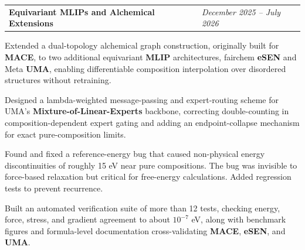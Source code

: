\documentclass[11pt,a4paper]{article}
\makeatletter
\newcommand{\subrole}[2]{%
  \vspace{0.45em}%
  \noindent\colorbox{subbg}{%
    \begin{minipage}{\dimexpr\textwidth-2\fboxsep}%
      \begin{tabular*}{\linewidth}{@{\extracolsep{\fill}} ll}
        \textbf{#1} & \textit{\small #2}%
      \end{tabular*}%
    \end{minipage}%
  }%
  \vspace{0.15em}%
}
\makeatother
\begin{document}
\subrole{Equivariant MLIPs and Alchemical Extensions}{December 2025 -- July 2026}
\begin{cvlist}
  \item Extended a dual-topology alchemical graph construction, originally built for \textbf{MACE}, to two additional equivariant \textbf{MLIP} architectures, fairchem \textbf{eSEN} and Meta \textbf{UMA}, enabling differentiable composition interpolation over disordered structures without retraining.
  \item Designed a lambda-weighted message-passing and expert-routing scheme for UMA's \textbf{Mixture-of-Linear-Experts} backbone, correcting double-counting in composition-dependent expert gating and adding an endpoint-collapse mechanism for exact pure-composition limits.
  \item Found and fixed a reference-energy bug that caused non-physical energy discontinuities of roughly 15 eV near pure compositions. The bug was invisible to force-based relaxation but critical for free-energy calculations. Added regression tests to prevent recurrence.
  \item Built an automated verification suite of more than 12 tests, checking energy, force, stress, and gradient agreement to about $10^{-7}$ eV, along with benchmark figures and formula-level documentation cross-validating \textbf{MACE}, \textbf{eSEN}, and \textbf{UMA}.
\end{cvlist}

\end{document}
